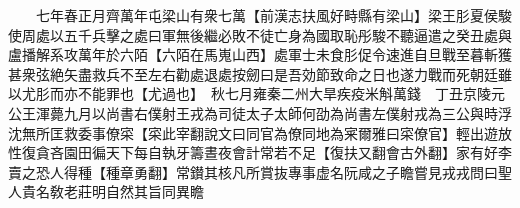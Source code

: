 　　七年春正月齊萬年屯梁山有衆七萬【前漢志扶風好畤縣有梁山】梁王肜夏侯駿使周處以五千兵擊之處曰軍無後繼必敗不徒亡身為國取恥彤駿不聽逼遣之癸丑處與盧播解系攻萬年於六陌【六陌在馬嵬山西】處軍士未食肜促令速進自旦戰至暮斬獲甚衆弦絶矢盡救兵不至左右勸處退處按劒曰是吾効節致命之日也遂力戰而死朝廷雖以尤肜而亦不能罪也【尤過也】　秋七月雍秦二州大旱疾疫米斛萬錢　丁丑京陵元公王渾薨九月以尚書右僕射王戎為司徒太子太師何劭為尚書左僕射戎為三公與時浮沈無所匡救委事僚寀【寀此宰翻說文曰同官為僚同地為宷爾雅曰寀僚官】輕出遊放性復貪吝園田徧天下每自執牙籌晝夜會計常若不足【復扶又翻會古外翻】家有好李賣之恐人得種【種章勇翻】常鑚其核凡所賞抜專事虚名阮咸之子瞻嘗見戎戎問曰聖人貴名敎老莊明自然其旨同異瞻